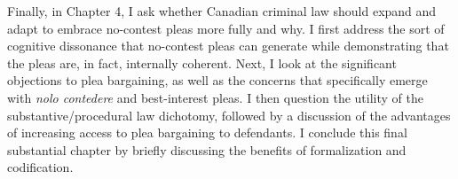 Finally, in Chapter 4, I ask whether Canadian criminal law should expand and adapt to embrace no-contest pleas more fully and why. I first address the sort of cognitive dissonance that no-contest pleas can generate while demonstrating that the pleas are, in fact, internally coherent. Next, I look at the significant objections to plea bargaining, as well as the concerns that specifically emerge with \textit{nolo contedere} and best-interest pleas. I then question the utility of the substantive/procedural law dichotomy, followed by a discussion of the advantages of increasing access to plea bargaining to defendants. I conclude this final substantial chapter by briefly discussing the benefits of formalization and codification.